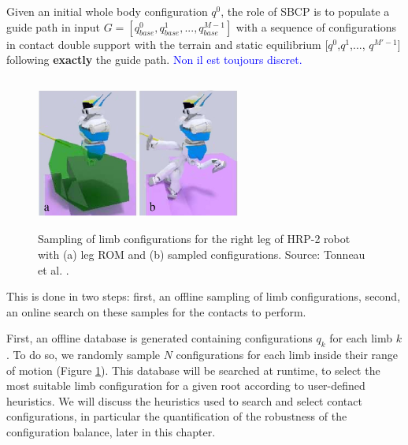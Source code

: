 Given an initial whole body configuration $q^0$, the role of SBCP is to populate a guide path in input $G = [q_{base}^0,q_{base}^1,..., q_{base}^{M-1}]$ with a sequence of configurations in contact double support with the terrain and static equilibrium [$q^0$,$q^1$,..., $q^{M'-1}$] following \textbf{exactly} the guide path. 
 \textcolor{blue}{Non il est toujours discret.} 

\begin{figure}
    \centering
    \includegraphics[width=0.6\textwidth, height=5cm]{Figures/Chapter_CPSB/denoised_config_sampled.jpg}
    \caption{Sampling of limb configurations for the right leg of HRP-2 robot with (a) leg ROM and (b) sampled configurations. Source: Tonneau et al. \cite{AcyclicCP}.}
    \label{fig:cp-sb:samples_rom}
\end{figure}

This is done in two steps: first, an offline sampling of limb configurations, second, an online search on these samples for the contacts to perform.

First, an offline database is generated containing configurations $q_k$ for each limb $k$. %
To do so, we randomly sample $N$ configurations for each limb inside their range of motion (Figure \ref{fig:cp-sb:samples_rom}).
This database will be searched at runtime, to select the most suitable limb configuration for a given root according to user-defined heuristics.
We will discuss the heuristics used to search and select contact configurations, in particular the quantification of the robustness of the configuration balance, later in this chapter. %

